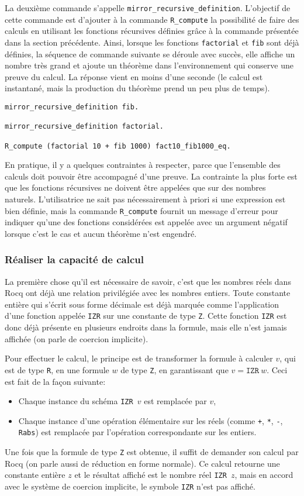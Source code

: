 \documentclass{jflart}
\begin{document}
La deuxième commande s'appelle \texttt{mirror\_recursive\_definition}.
L'objectif de cette commande est d'ajouter à la commande
\texttt{R\_compute} la possibilité de faire des calculs en utilisant
les fonctions récursives définies grâce à la commande présentée dans
la section précédente.  Ainsi, lorsque les fonctions
\texttt{factorial} et \texttt{fib} sont
déjà définies, la séquence de commande suivante se déroule avec succès,
elle affiche un nombre très grand et ajoute un théorème dans
l'environnement qui conserve une preuve du calcul.  La réponse vient
en moins d'une seconde (le calcul est instantané, mais la production
du théorème prend un peu plus de temps).
\begin{verbatim}
mirror_recursive_definition fib.

mirror_recursive_definition factorial.

R_compute (factorial 10 + fib 1000) fact10_fib1000_eq.
\end{verbatim}
En pratique, il y a quelques contraintes à respecter, parce que
l'ensemble des calculs doit pouvoir être accompagné d'une preuve.  La
contrainte la plus forte est que les fonctions récursives ne doivent
être appelées que sur des nombres naturels.  L'utilisatrice ne sait
pas nécessairement à priori si une expression est bien définie, mais
la commande \texttt{R\_compute} fournit un message d'erreur pour indiquer
qu'une des fonctions considérées est appelée avec un argument négatif
lorsque c'est le cas et aucun théorème n'est engendré.

\subsubsection{Réaliser la capacité de calcul}
La première chose qu'il est nécessaire de savoir, c'est que les
nombres réels dans Rocq ont déjà une relation privilégiée avec les
nombres entiers.  Toute constante entière qui s'écrit sous forme
décimale est déjà marquée comme l'application d'une fonction appelée
\texttt{IZR} sur une constante de type \texttt{Z}.  Cette fonction \texttt{IZR}
est donc déjà présente en plusieurs endroits dans la formule, mais
elle n'est jamais affichée (on parle de coercion implicite).

Pour effectuer le calcul, le principe est de transformer la formule à
calculer \(v\), qui est de type \texttt{R}, en une formule \(w\)
de type \texttt{Z}, en garantissant que \(v = \texttt{IZR}~w\).  Ceci est
fait de la façon suivante:
\begin{itemize}
\item Chaque instance du schéma \texttt{IZR \(v\)} est remplacée par \(v\),
\item Chaque instance d'une opération élémentaire sur les
réels (comme \texttt{+}, \texttt{*}, \texttt{-}, \texttt{Rabs}) est remplacée par
l'opération correspondante sur les entiers.
\end{itemize}
Une fois que la formule de type \texttt{Z} est obtenue, il suffit de demander
son calcul par Rocq (on parle aussi de réduction en forme normale).
Ce calcul retourne une constante entière \(z\) et le résultat
affiché est le nombre réel \texttt{IZR \(z\)}, mais en accord avec le
système de coercion implicite, le symbole \texttt{IZR} n'est pas affiché.
\end{document}
